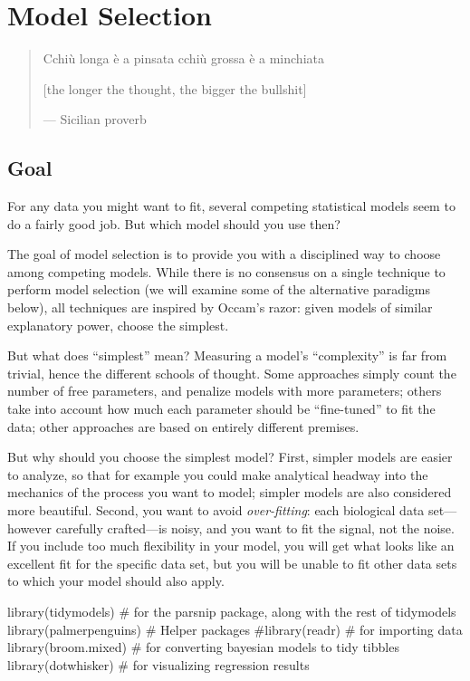 \documentclass[
  letterpaper,
  DIV=11,
  numbers=noendperiod]{scrreprt}
\newenvironment{Shaded}{\begin{snugshade}}{\end{snugshade}}
\newcommand{\NormalTok}[1]{\textcolor[rgb]{0.00,0.23,0.31}{#1}}
\begin{document}

\chapter{Model Selection}\label{model-selection}

\begin{quote}
Cchiù longa è a pinsata cchiù grossa è a minchiata

{[}the longer the thought, the bigger the bullshit{]}

--- Sicilian proverb
\end{quote}

\section{Goal}\label{goal-3}

For any data you might want to fit, several competing statistical models
seem to do a fairly good job. But which model should you use then?

The goal of model selection is to provide you with a disciplined way to
choose among competing models. While there is no consensus on a single
technique to perform model selection (we will examine some of the
alternative paradigms below), all techniques are inspired by Occam's
razor: given models of similar explanatory power, choose the simplest.

But what does ``simplest'' mean? Measuring a model's ``complexity'' is
far from trivial, hence the different schools of thought. Some
approaches simply count the number of free parameters, and penalize
models with more parameters; others take into account how much each
parameter should be ``fine-tuned'' to fit the data; other approaches are
based on entirely different premises.

But why should you choose the simplest model? First, simpler models are
easier to analyze, so that for example you could make analytical headway
into the mechanics of the process you want to model; simpler models are
also considered more beautiful. Second, you want to avoid
\emph{over-fitting}: each biological data set---however carefully
crafted---is noisy, and you want to fit the signal, not the noise. If
you include too much flexibility in your model, you will get what looks
like an excellent fit for the specific data set, but you will be unable
to fit other data sets to which your model should also apply.

\begin{Shaded}
\begin{Highlighting}[]
\NormalTok{library(tidymodels)  \# for the parsnip package, along with the rest of tidymodels}
\NormalTok{library(palmerpenguins)}
\NormalTok{\# Helper packages}
\NormalTok{\#library(readr)       \# for importing data}
\NormalTok{library(broom.mixed) \# for converting bayesian models to tidy tibbles}
\NormalTok{library(dotwhisker)  \# for visualizing regression results}
\end{Highlighting}
\end{Shaded}
\end{document}
